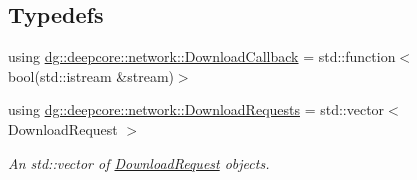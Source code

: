 \subsection*{Typedefs}
\begin{DoxyCompactItemize}
\item 
using \hyperlink{group___network_module_ga4d618c88e9b1e6e961f70621dc9aab41}{dg\+::deepcore\+::network\+::\+Download\+Callback} = std\+::function$<$ bool(std\+::istream \&stream)$>$
\item 
using \hyperlink{group___network_module_ga6a460317d5e2b04bbaa2bb5389ca2ce3}{dg\+::deepcore\+::network\+::\+Download\+Requests} = std\+::vector$<$ Download\+Request $>$
\begin{DoxyCompactList}\small\item\em An std\+::vector of \hyperlink{structdg_1_1deepcore_1_1network_1_1_download_request}{Download\+Request} objects. \end{DoxyCompactList}\end{DoxyCompactItemize}
